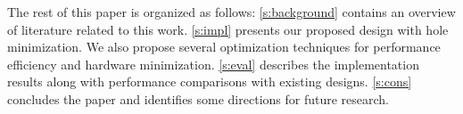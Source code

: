 The rest of this paper is organized as follows:
\autoref{s:background} contains an overview of literature related to this work.
\autoref{s:impl} presents our proposed design with hole minimization. We also propose several optimization techniques for performance efficiency and hardware minimization.
\autoref{s:eval} describes the implementation results along with performance comparisons with existing designs.
\autoref{s:cons} concludes the paper and identifies some directions for future research.

